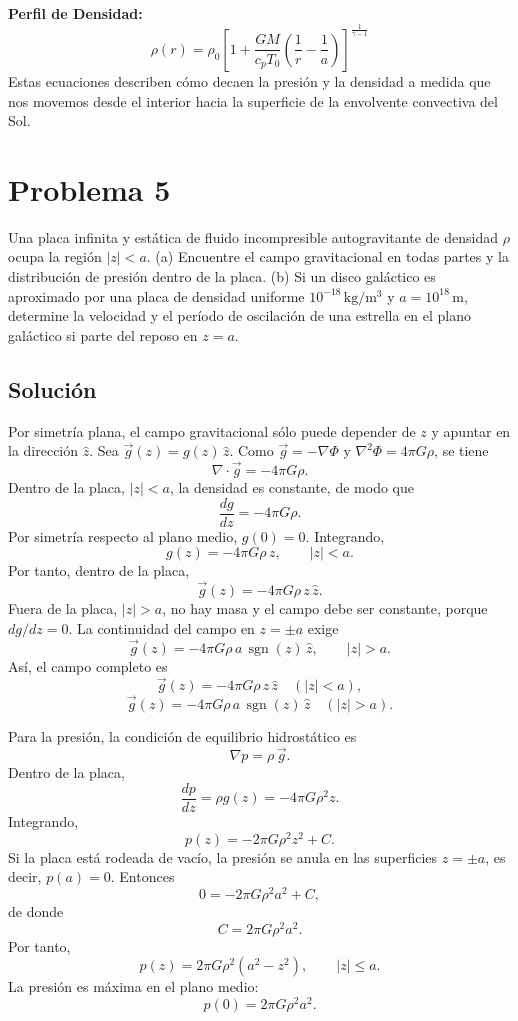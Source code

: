 \documentclass[a4paper]{article}
\begin{document}
\textbf{Perfil de Densidad:}
$$ \rho(r) = \rho_0 \left[ 1 + \frac{GM}{c_p T_0} \left( \frac{1}{r} - \frac{1}{a} \right) \right]^{\frac{1}{\gamma-1}} $$
Estas ecuaciones describen cómo decaen la presión y la densidad a medida que nos movemos desde el interior hacia la superficie de la envolvente convectiva del Sol.

\section{Problema 5}

Una placa infinita y estática de fluido incompresible autogravitante de densidad $\rho$ ocupa la región $|z|<a$.
(a) Encuentre el campo gravitacional en todas partes y la distribución de presión dentro de la placa.
(b) Si un disco galáctico es aproximado por una placa de densidad uniforme $10^{-18}\,\mathrm{kg/m^3}$ y $a=10^{18}\,\mathrm{m}$, determine la velocidad y el período de oscilación de una estrella en el plano galáctico si parte del reposo en $z=a$.



\subsection{Solución}

Por simetría plana, el campo gravitacional sólo puede depender de $z$ y apuntar en la dirección $\hat z$. Sea $\vec g(z)=g(z)\,\hat z$. Como $\vec g=-\nabla\Phi$ y $\nabla^2\Phi=4\pi G\rho$, se tiene
$$
\nabla\cdot\vec g=-4\pi G\rho.
$$
Dentro de la placa, $|z|<a$, la densidad es constante, de modo que
$$
\frac{dg}{dz}=-4\pi G\rho.
$$
Por simetría respecto al plano medio, $g(0)=0$. Integrando,
$$
g(z)=-4\pi G\rho\,z, \qquad |z|<a.
$$
Por tanto, dentro de la placa,
$$
\vec g(z)=-4\pi G\rho\,z\,\hat z.
$$
Fuera de la placa, $|z|>a$, no hay masa y el campo debe ser constante, porque $dg/dz=0$. La continuidad del campo en $z=\pm a$ exige
$$
\vec g(z)=-4\pi G\rho\,a\,\operatorname{sgn}(z)\,\hat z, \qquad |z|>a.
$$
Así, el campo completo es
$$
\vec g(z)=
-4\pi G\rho\,z\,\hat z \quad (|z|<a),
$$
$$
\vec g(z)=
-4\pi G\rho\,a\,\operatorname{sgn}(z)\,\hat z \quad (|z|>a).
$$

Para la presión, la condición de equilibrio hidrostático es
$$
\nabla p=\rho\,\vec g.
$$
Dentro de la placa,
$$
\frac{dp}{dz}=\rho g(z)=-4\pi G\rho^2 z.
$$
Integrando,
$$
p(z)=-2\pi G\rho^2 z^2+C.
$$
Si la placa está rodeada de vacío, la presión se anula en las superficies $z=\pm a$, es decir, $p(a)=0$. Entonces
$$
0=-2\pi G\rho^2 a^2+C,
$$
de donde
$$
C=2\pi G\rho^2 a^2.
$$
Por tanto,
$$
p(z)=2\pi G\rho^2\left(a^2-z^2\right), \qquad |z|\le a.
$$
La presión es máxima en el plano medio:
$$
p(0)=2\pi G\rho^2 a^2.
$$
\end{document}
